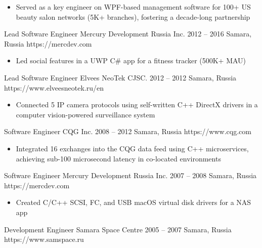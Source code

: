 \documentclass[9pt,a4paper]{juicv}
\begin{document}
\begin{paracol}{2}
        \begin{itemize}
            \item Served as a key engineer on WPF-based management software
                  for 100+ US beauty salon networks (5K+ branches),
                  fostering a decade-long partnership
        \end{itemize}

    \cvLeftEvent
        {Lead Software Engineer}
        {Mercury Development Russia Inc.}
        {2012 -- 2016}
        {Samara, Russia}
        {https://mercdev.com}

        \begin{itemize}
            \item Led social features in a UWP C\# app for a fitness tracker (500K+ MAU)
        \end{itemize}

    \cvLeftEvent
        {Lead Software Engineer}
        {Elvees NeoTek CJSC.}
        {2012 -- 2012}
        {Samara, Russia}
        {https://www.elveesneotek.ru/en}

        \begin{itemize}
            \item Connected 5 IP camera protocols using self-written C++ DirectX drivers
                  in a computer vision-powered surveillance system
        \end{itemize}

    \cvLeftEvent
        {Software Engineer}
        {CQG Inc.}
        {2008 -- 2012}
        {Samara, Russia}
        {https://www.cqg.com}

        \begin{itemize}
            \item Integrated 16 exchanges into the CQG data feed using C++ microservices,
                  achieving sub-100 microsecond latency in co-located environments
        \end{itemize}

    \cvLeftEvent
        {Software Engineer}
        {Mercury Development Russia Inc.}
        {2007 -- 2008}
        {Samara, Russia}
        {https://mercdev.com}

        \begin{itemize}
            \item Created C/C++ SCSI, FC, and USB macOS virtual disk drivers for a NAS app
        \end{itemize}

    \cvLeftEvent
        {Development Engineer}
        {Samara Space Centre}
        {2005 -- 2007}
        {Samara, Russia}
        {https://www.samspace.ru}


\end{paracol}
\end{document}
